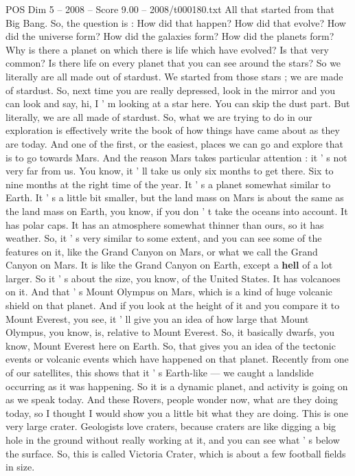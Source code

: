 \begin{textsample}{POS Dim 5 – 2008 – Score 9.00 – 2008/t000180.txt}
All that started from that Big Bang.
So, the question is : How did that happen?
How did that evolve?
How did the universe form?
How did the galaxies form?
How did the planets form?
Why is there a planet on which there is life which have evolved?
Is that very common?
Is there life on every planet that you can see around the stars?
So we literally are all made out of stardust.
We started from those stars ; we are made of stardust.
So, next time you are really depressed, look in the mirror and you can look and say, hi, I ' m looking at a star here.
You can skip the dust part.
But literally, we are all made of stardust.
So, what we are trying to do in our exploration is effectively write the book of how things have came about as they are today.
And one of the first, or the easiest, places we can go and explore that is to go towards Mars.
And the reason Mars takes particular attention : it ' s not very far from us.
You know, it ' ll take us only six months to get there.
Six to nine months at the right time of the year.
It ' s a planet somewhat similar to Earth.
It ' s a little bit smaller, but the land mass on Mars is about the same as the land mass on Earth, you know, if you don ' t take the oceans into account.
It has polar caps.
It has an atmosphere somewhat thinner than ours, so it has weather.
So, it ' s very similar to some extent, and you can see some of the features on it, like the Grand Canyon on Mars, or what we call the Grand Canyon on Mars.
It is like the Grand Canyon on Earth, except a \textbf{hell} of a lot larger.
So it ' s about the size, you know, of the United States.
It has volcanoes on it.
And that ' s Mount Olympus on Mars, which is a kind of huge volcanic shield on that planet.
And if you look at the height of it and you compare it to Mount Everest, you see, it ' ll give you an idea of how large that Mount Olympus, you know, is, relative to Mount Everest.
So, it basically dwarfs, you know, Mount Everest here on Earth.
So, that gives you an idea of the tectonic events or volcanic events which have happened on that planet.
Recently from one of our satellites, this shows that it ' s Earth-like — we caught a landslide occurring as it was happening.
So it is a dynamic planet, and activity is going on as we speak today.
And these Rovers, people wonder now, what are they doing today, so I thought I would show you a little bit what they are doing.
This is one very large crater.
Geologists love craters, because craters are like digging a big hole in the ground without really working at it, and you can see what ' s below the surface.
So, this is called Victoria Crater, which is about a few football fields in size.

\end{textsample}
